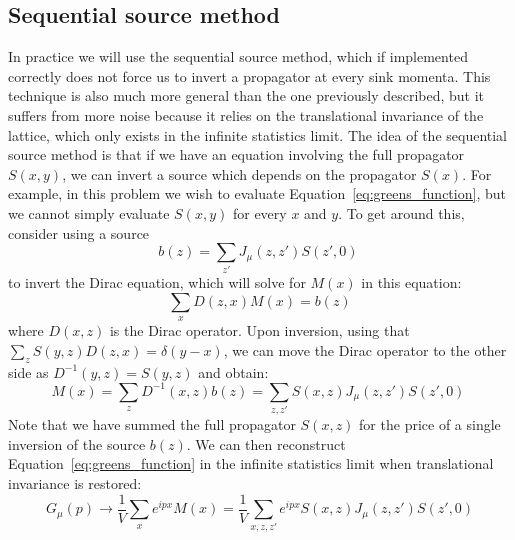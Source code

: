 \documentclass[11pt, oneside]{article}   	%
\theoremstyle{definition}
\begin{document}
\subsection{Sequential source method}

In practice we will use the sequential source method, which if implemented correctly does not force us to invert a propagator 
at every sink momenta. This technique is also much more general than the one previously described, but it suffers from 
more noise because it relies on the translational invariance of the lattice, which only exists in the infinite statistics 
limit. The idea of the sequential source method is that if we have an equation involving the full propagator $S(x, y)$, we can 
invert a source which depends on the propagator $S(x)$. For example, in this problem we wish to evaluate 
Equation~\ref{eq:greens_function}, but we cannot simply evaluate $S(x, y)$ for every $x$ and $y$. To get around this, 
consider using a source
\begin{equation}
	b(z) = \sum_{z'} J_\mu(z, z') S(z', 0)~
	\label{eq:source}
\end{equation}
to invert the Dirac equation, which will solve for $M(x)$ in this equation:
\begin{equation}
	\sum_x D(z, x) M(x) = b(z)
\end{equation} 
where $D(x, z)$ is the Dirac operator. Upon inversion, using that $\sum_z S(y, z) D(z, x) = \delta(y - x)$, we can move the 
Dirac operator to the other side as $D^{-1}(y, z) = S(y, z)$ and obtain:
\begin{equation}
	M(x) = \sum_z D^{-1}(x, z) b(z) = \sum_{z, z'} S(x, z) J_\mu(z, z') S(z', 0)~
	\label{eq:inversion}
\end{equation}
Note that we have summed the full propagator $S(x, z)$ for the price of a single inversion of the source $b(z)$. We can then 
reconstruct Equation~\ref{eq:greens_function} in the infinite statistics limit when translational invariance is restored:
\begin{equation}
	G_\mu(p) \rightarrow \frac{1}{V} \sum_x e^{ipx} M(x) = \frac{1}{V} \sum_{x, z, z'} e^{ipx} S(x, z) J_\mu(z, z') S(z', 0)
\end{equation}
\end{document}
